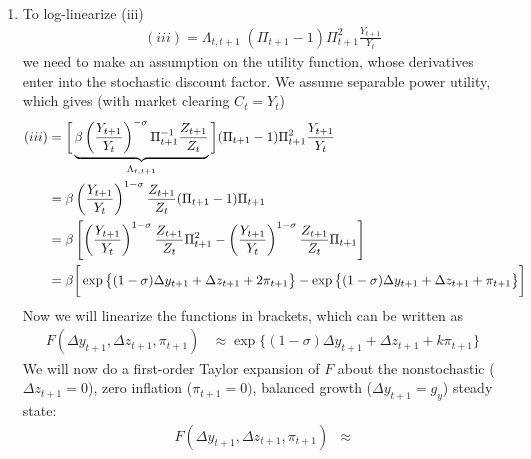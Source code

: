 \documentclass[12pt]{article}
\theoremstyle{plain}
\theoremstyle{definition}
\theoremstyle{remark}
\begin{document}
\begin{itemize}
\begin{enumerate}[label=(\roman*)]
      \item
        To log-linearize (iii)
        \begin{align*}
          (iii)
          =
          \Lambda_{t,t+1}\;
          (\Pi_{t+1}-1)\Pi^2_{t+1}\frac{Y_{t+1}}{Y_t}
        \end{align*}
        we need to make an assumption on the utility function, whose
        derivatives enter into the stochastic discount factor. We assume
        separable power utility, which gives (with market clearing
        $C_t=Y_t$)
        \begin{align*}
          (iii)
          &=
          \bigg[
          \underbrace{%
          \beta\left(\frac{Y_{t+1}}{Y_t}\right)^{-\sigma}
          \Pi_{t+1}^{-1}
          \frac{Z_{t+1}}{Z_t}
          }_{\Lambda_{t,t+1}}
          \bigg]
          (\Pi_{t+1}-1)\Pi^2_{t+1}\frac{Y_{t+1}}{Y_t}
          \\
          &=
          \beta\left(\frac{Y_{t+1}}{Y_t}\right)^{1-\sigma}
          \frac{Z_{t+1}}{Z_t}
          (\Pi_{t+1}-1)\Pi_{t+1} \\
          &=
          \beta
          \left[
          \left(\frac{Y_{t+1}}{Y_t}\right)^{1-\sigma}
          \frac{Z_{t+1}}{Z_t}
          \Pi_{t+1}^2
          -
          \left(\frac{Y_{t+1}}{Y_t}\right)^{1-\sigma}
          \frac{Z_{t+1}}{Z_t}
          \Pi_{t+1}
          \right]
          \\
          &=
          \beta
          \bigg[
          \exp\big\{
          (1-\sigma)\Delta y_{t+1}
          + \Delta z_{t+1}
          + 2\pi_{t+1}
          \big\}
          -
          \exp\big\{
          (1-\sigma)\Delta y_{t+1}
          + \Delta z_{t+1}
          + \pi_{t+1}
          \big\}
          \bigg]
        \end{align*}
        Now we will linearize the functions in brackets, which can be
        written as
        \begin{align*}
          F(\Delta y_{t+1}, \Delta z_{t+1}, \pi_{t+1})
          &\approx
          \exp\big\{
          (1-\sigma)\Delta y_{t+1}
          + \Delta z_{t+1}
          + k\pi_{t+1}
          \big\}
        \end{align*}
        We will now do a first-order Taylor expansion of $F$ about the
        nonstochastic ($\Delta z_{t+1}=0$), zero inflation
        ($\pi_{t+1}=0)$, balanced growth ($\Delta y_{t+1}=g_y$) steady
        state:
        \begin{align*}
          F(\Delta y_{t+1}, \Delta z_{t+1}, \pi_{t+1})
          &\approx

\end{align*}
\end{enumerate}
\end{itemize}
\end{document}
